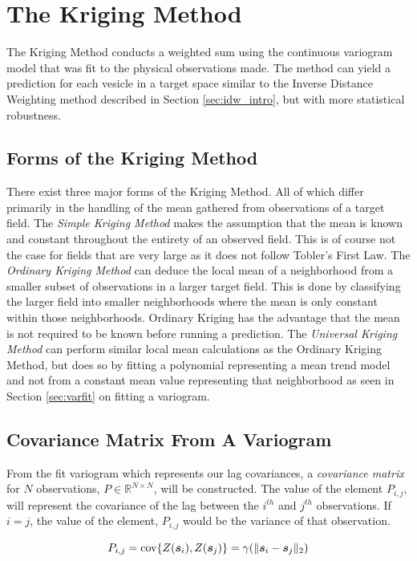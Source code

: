 \chapter{The Kriging Method}
The Kriging Method conducts a weighted sum using the continuous variogram model that was fit to the physical observations made. The method can yield a prediction for each vesicle in a target space similar to the Inverse Distance Weighting method described in Section \ref{sec:idw_intro}, but with more statistical robustness.

\section{Forms of the Kriging Method}
There exist three major forms of the Kriging Method. All of which differ primarily in the handling of the mean gathered from observations of a target field. The \textit{Simple Kriging Method} makes the assumption that the mean is known and constant throughout the entirety of an observed field. This is of course not the case for fields that are very large as it does not follow Tobler's First Law. The \textit{Ordinary Kriging Method} can deduce the local mean of a neighborhood from a smaller subset of observations in a larger target field. This is done by classifying the larger field into smaller neighborhoods where the mean is only constant within those neighborhoods. Ordinary Kriging has the advantage that the mean is not required to be known before running a prediction. The \textit{Universal Kriging Method} can perform similar local mean calculations as the Ordinary Kriging Method, but does so by fitting a polynomial representing a mean trend model and not from a constant mean value representing that neighborhood \cite{vandergraaf:nnkrig} as seen in Section \ref{sec:varfit} on fitting a variogram.

\section{Covariance Matrix From A Variogram} \label{sec:covmat}
From the fit variogram which represents our lag covariances, a \textit{covariance matrix} for $N$ observations, $P \in \mathbb{R}^{N \times N}$, will be constructed. The value of the element $P_{i,j}$, will represent the covariance of the lag between the $i^{th}$ and $j^{th}$ observations. If $i=j$, the value of the element, $P_{i,j}$ would be the variance of that observation. 

\begin{equation}
    P_{i,j} = \text{cov}\{Z({\it{\boldsymbol{s}}}_{i}), Z({\it{\boldsymbol{s}}}_{j})\} = \gamma(\| {\it{\boldsymbol{s}}}_i - {\it{\boldsymbol{s}}}_j \|_2)
    \label{eq:covvarmatelem}
\end{equation}

